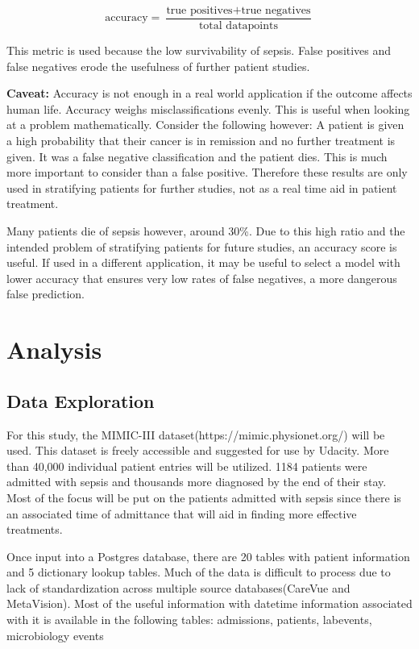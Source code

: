 \documentclass[11pt]{article}
\begin{document}
	\[ \text{accuracy} = \frac{\text{true positives} + \text{true negatives}} {\text{total datapoints}} \]
	
	
	
	This metric is used because the low survivability of sepsis. False positives and false negatives erode the usefulness of further patient studies.
	
	\textbf{Caveat:} Accuracy is not enough in a real world application if the outcome affects human life. Accuracy weighs misclassifications evenly. This is useful when looking at a problem mathematically. Consider the following however: A patient is given a high probability that their cancer is in remission and no further treatment is given. It was a false negative classification and the patient dies. This is much more important to consider than a false positive. Therefore these results are only used in stratifying patients for further studies, not as a real time aid in patient treatment.
	
	Many patients die of sepsis however, around 30\%. Due to this high ratio and the intended problem of stratifying patients for future studies, an accuracy score is useful. If used in a different application, it may be useful to select a model with lower accuracy that ensures very low rates of false negatives, a more dangerous false prediction.
	
	\section{Analysis}
	\subsection{Data Exploration}
	For this study, the MIMIC-III dataset(https://mimic.physionet.org/) will be used. This dataset is freely accessible and suggested for use by Udacity. More than 40,000 individual patient entries will be utilized. 1184 patients were admitted with sepsis and thousands more diagnosed by the end of their stay. Most of the focus will be put on the patients admitted with sepsis since there is an associated time of admittance that will aid in finding more effective treatments.
	
	Once input into a Postgres database, there are 20 tables with patient information and 5 dictionary lookup tables. Much of the data is difficult to process due to lack of standardization across multiple source databases(CareVue and MetaVision). Most of the useful information with datetime information associated with it is available in the following tables: admissions, patients, labevents, microbiology events
	
\end{document}
